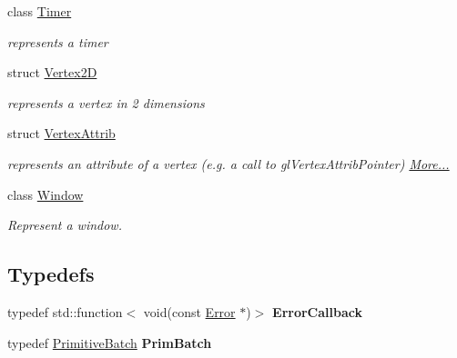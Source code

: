 \begin{DoxyCompactItemize}
class \hyperlink{classnta_1_1Timer}{Timer}
\begin{DoxyCompactList}\small\item\em represents a timer \end{DoxyCompactList}\item 
struct \hyperlink{structnta_1_1Vertex2D}{Vertex2D}
\begin{DoxyCompactList}\small\item\em represents a vertex in 2 dimensions \end{DoxyCompactList}\item 
struct \hyperlink{namespacenta_df/d9d/structnta_1_1VertexAttrib}{Vertex\+Attrib}
\begin{DoxyCompactList}\small\item\em represents an attribute of a vertex (e.\+g. a call to gl\+Vertex\+Attrib\+Pointer)  \hyperlink{namespacenta_df/d9d/structnta_1_1VertexAttrib}{More...}\end{DoxyCompactList}\item 
class \hyperlink{classnta_1_1Window}{Window}
\begin{DoxyCompactList}\small\item\em Represent a window. \end{DoxyCompactList}\end{DoxyCompactItemize}
\subsection*{Typedefs}
\begin{DoxyCompactItemize}
\item 
\mbox{\label{namespacenta_a1f5715ee41c7a9174d2cc404fdb8556a}} 
typedef std\+::function$<$ void(const \hyperlink{structnta_1_1Error}{Error} $\ast$)$>$ {\bfseries Error\+Callback}
\item 
\mbox{\label{namespacenta_acee44e1bbf4f2431ec51a26e231691e5}} 
typedef \hyperlink{classnta_1_1PrimitiveBatch}{Primitive\+Batch} {\bfseries Prim\+Batch}
\end{DoxyCompactItemize}
